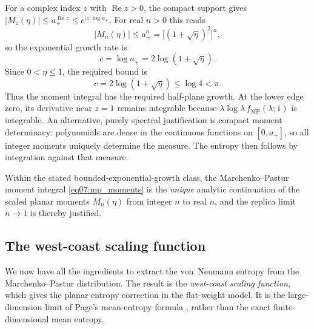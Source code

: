 \documentclass[11pt,letterpaper]{article}
\theoremstyle{plain}
\theoremstyle{definition}
\theoremstyle{remark}
\begin{document}
For a complex index $z$ with $\operatorname{Re}z>0$, the compact support
gives $|M_z(\eta)|\leq a_+^{\operatorname{Re}z}\leq e^{|z|\log a_+}$.
For real $n>0$ this reads
\begin{equation}
  |M_n(\eta)| \leq a_+^n = \bigl[(1+\sqrt{\eta})^2\bigr]^n,
  \label{eq07:moment_bound}
\end{equation}
so the exponential growth rate is
\begin{equation}
  c = \log a_+ = 2\log(1+\sqrt{\eta}).
  \label{eq07:growth_rate}
\end{equation}
Since $0<\eta\leq1$, the required bound is
\begin{equation}
 c=2\log(1+\sqrt\eta)\leq\log4<\pi.
 \label{eq07:carlson_bound}
\end{equation}
Thus the moment integral has the required half-plane growth.  At the lower
edge zero, its derivative near $z=1$ remains integrable because
$\lambda\log\lambda\,f_{\mathrm{MP}}(\lambda;1)$ is integrable.
An alternative, purely spectral justification is compact moment
determinacy: polynomials are dense in the continuous functions on
$[0,a_+]$, so all integer moments uniquely determine the measure.  The
entropy then follows by integration against that measure.

Within the stated bounded-exponential-growth class, the
Marchenko--Pastur moment integral \eqref{eq07:mp_moments} is the
\emph{unique} analytic continuation of the scaled planar moments
$M_n(\eta)$ from integer $n$ to real $n$, and the replica limit
$n \to 1$ is thereby justified.


\subsection{The west-coast scaling function}
\label{subsec07:penington_scaling}

We now have all the ingredients to extract the von~Neumann entropy from
the Marchenko--Pastur distribution.  The result is the
\emph{west-coast scaling function}, which gives the planar entropy correction in the flat-weight model.
It is the large-dimension limit of Page's mean-entropy formula
\cite{page1993}, rather than the exact finite-dimensional mean entropy.
\end{document}
